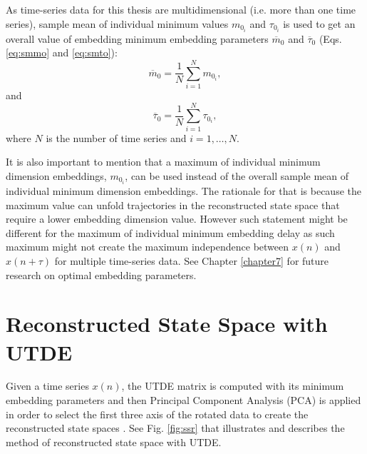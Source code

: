 As time-series data for this thesis are multidimensional 
(i.e. more than one time series), sample mean 
of individual minimum values $m_{0_i}$ and $\tau_{0_i}$  
is used to get an 
overall value of embedding minimum embedding parameters
$\overline{m}_0$ and $\overline{\tau}_0$ (Eqs. \ref{eq:smmo} and \ref{eq:smto}): 
\begin{equation} \label{eq:smmo}
	\overline{m}_0= \frac{1}{N} \sum^{N}_{i = 1} m_{0_i},
\end{equation}
and 
\begin{equation} \label{eq:smto}
	\overline{\tau}_0= \frac{1}{N} \sum^{N}_{i = 1} \tau_{0_i}, 
\end{equation}
where $N$ is the number of time series and $i=1,\dots, N$.

It is also important to mention that a maximum of individual minimum 
dimension embeddings, $m_{0_i}$, can be used instead of the overall 
sample mean of individual minimum dimension embeddings. The rationale
for that is because the maximum value can unfold trajectories 
in the reconstructed state space that require a lower embedding 
dimension value. However such statement might be different 
for the maximum of individual minimum embedding delay as such 
maximum might not create the maximum independence 
between $x(n)$ and $x(n+\tau)$ for multiple time-series data. 
See Chapter \ref{chapter7} for future research on optimal embedding 
parameters.

\section{Reconstructed State Space with UTDE} \label{sec:rsswithUTDE}
Given a time series $x(n)$, the UTDE matrix is computed with its 
minimum embedding parameters and then Principal Component Analysis 
(PCA) is applied in order to select 
the first three axis of the rotated data to create the reconstructed 
state spaces \citep{frank2010, sama2013}.
See Fig. \ref{fig:ssr} that illustrates and describes the method of 
reconstructed state space with UTDE.

